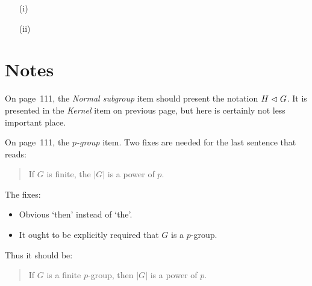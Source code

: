 \begin{itemize}
 \item[(i)]
 \item[(ii)]
\end{itemize}

\fi





\appendix


\section{Notes}

On page~111,
the \emph{Normal subgroup} item should present the notation
\(H\vartriangleleft G\). It is presented in the \emph{Kernel} item
on previous page, but here is certainly not less important place.

On page~111,
the \emph{$p$-group} item.
Two fixes are needed for the last sentence that reads:
\begin{quotation}
If $G$ is finite, the \(|G|\) is a power of $p$.
\end{quotation}

The fixes:
\begin{itemize}
 \item Obvious `then' instead of `the'.
 \item It ought to be explicitly required that $G$ is a $p$-group.
\end{itemize}
Thus it should be:
\begin{quotation}
If $G$ is a finite $p$-group, then \(|G|\) is a power of $p$.
\end{quotation}

